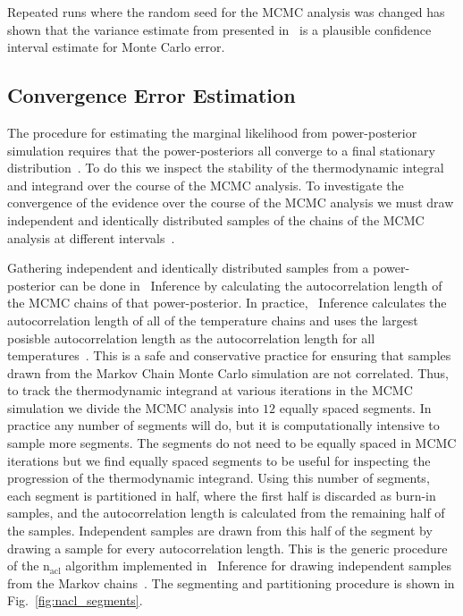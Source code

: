 Repeated runs where the random seed for the MCMC analysis was changed has shown that the variance estimate from presented in~\cite{annis2019thermodynamic} is a plausible confidence interval estimate for Monte Carlo error.

\subsection{Convergence Error Estimation}\label{sec:evidence_convergence}
The procedure for estimating the marginal likelihood from power-posterior simulation requires that the power-posteriors all converge to a final stationary distribution~\cite{lartillot2006computing}. To do this we inspect the stability of the thermodynamic integral and integrand over the course of the MCMC analysis. To investigate the convergence of the evidence over the course of the MCMC analysis we must draw independent and identically distributed samples of the chains of the MCMC analysis at different intervals~\cite{annis2019thermodynamic}.

Gathering independent and identically distributed samples from a power-posterior can be done in \pycbc{}\ Inference by calculating the autocorrelation length of the MCMC chains of that power-posterior. In practice, \pycbc{}\ Inference calculates the autocorrelation length of all of the temperature chains and uses the largest posisble autocorrelation length as the autocorrelation length for all temperatures~\cite{biwer2019pycbc}. This is a safe and conservative practice for ensuring that samples drawn from the Markov Chain Monte Carlo simulation are not correlated. Thus, to track the thermodynamic integrand at various iterations in the MCMC simulation we divide the MCMC analysis into $12$ equally spaced segments. In practice any number of segments will do, but it is computationally intensive to sample more segments. The segments do not need to be equally spaced in MCMC iterations but we find equally spaced segments to be useful for inspecting the progression of the thermodynamic integrand. Using this number of segments, each segment is partitioned in half, where the first half is discarded as burn-in samples, and the autocorrelation length is calculated from the remaining half of the samples. Independent samples are drawn from this half of the segment by drawing a sample for every autocorrelation length. This is the generic procedure of the $\mathrm{n_{acl}}$ algorithm implemented in \pycbc{}\ Inference for drawing independent samples from the Markov chains~\cite{biwer2019pycbc}. The segmenting and partitioning procedure is shown in Fig.~\ref{fig:nacl_segments}.

